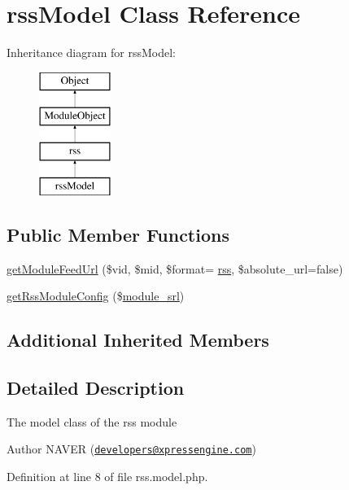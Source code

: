 \hypertarget{classrssModel}{}\section{rss\+Model Class Reference}
\label{classrssModel}
Inheritance diagram for rss\+Model\+:\begin{figure}[H]
\begin{center}
\leavevmode
\includegraphics[height=4.000000cm]{classrssModel}
\end{center}
\end{figure}
\subsection*{Public Member Functions}
\begin{DoxyCompactItemize}
\item 
\hyperlink{classrssModel_a2e188c3e11aab64655f3eb3d40b41ec3}{get\+Module\+Feed\+Url} (\$vid, \$mid, \$format= \textquotesingle{}\hyperlink{classrss}{rss}\textquotesingle{}, \$absolute\+\_\+url=false)
\item 
\hyperlink{classrssModel_a3c6f9fd398a931ff32038e2a48745bad}{get\+Rss\+Module\+Config} (\$\hyperlink{ko_8install_8php_a370bb6450fab1da3e0ed9f484a38b761}{module\+\_\+srl})
\end{DoxyCompactItemize}
\subsection*{Additional Inherited Members}


\subsection{Detailed Description}
The model class of the rss module

\begin{DoxyAuthor}{Author}
N\+A\+V\+E\+R (\href{mailto:developers@xpressengine.com}{\tt developers@xpressengine.\+com}) 
\end{DoxyAuthor}


Definition at line 8 of file rss.\+model.\+php.



